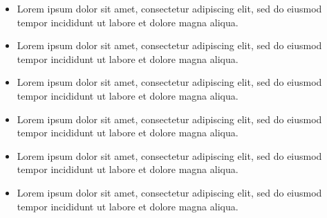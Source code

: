 \documentclass[10pt,a4paper,ragged2e,landscape]{altacv}
\begin{document}

\marginpar{}
\makecvheader


\begin{itemize}
\item Lorem ipsum dolor sit amet, consectetur adipiscing elit, sed do eiusmod tempor incididunt ut labore et dolore magna aliqua. 
\item Lorem ipsum dolor sit amet, consectetur adipiscing elit, sed do eiusmod tempor incididunt ut labore et dolore magna aliqua. 
\end{itemize}
\divider

\begin{itemize}
	\item Lorem ipsum dolor sit amet, consectetur adipiscing elit, sed do eiusmod tempor incididunt ut labore et dolore magna aliqua. 
	\item Lorem ipsum dolor sit amet, consectetur adipiscing elit, sed do eiusmod tempor incididunt ut labore et dolore magna aliqua. 
\end{itemize}
\divider

\begin{itemize}
\item Lorem ipsum dolor sit amet, consectetur adipiscing elit, sed do eiusmod tempor incididunt ut labore et dolore magna aliqua. 
\item Lorem ipsum dolor sit amet, consectetur adipiscing elit, sed do eiusmod tempor incididunt ut labore et dolore magna aliqua. 
\end{itemize}
\end{document}

